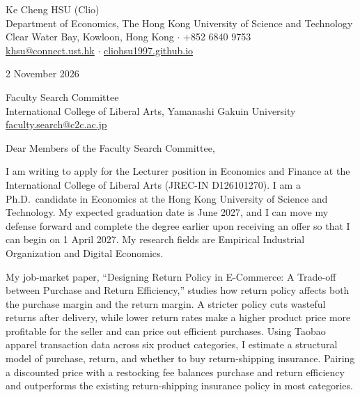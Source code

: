 \documentclass[11pt]{article}
\begin{document}
\begin{flushleft}
Ke Cheng HSU (Clio)\\
Department of Economics, The Hong Kong University of Science and Technology\\
Clear Water Bay, Kowloon, Hong Kong $\cdot$ +852 6840 9753\\
\href{mailto:khsu@connect.ust.hk}{khsu@connect.ust.hk} $\cdot$ \href{https://cliohsu1997.github.io}{cliohsu1997.github.io}
\end{flushleft}

2 November 2026

\vspace{0.2em}
Faculty Search Committee\\
International College of Liberal Arts, Yamanashi Gakuin University\\
\href{mailto:faculty.search@c2c.ac.jp}{faculty.search@c2c.ac.jp}

\vspace{0.2em}
Dear Members of the Faculty Search Committee,

I am writing to apply for the Lecturer position in Economics and Finance at the International College of Liberal Arts (JREC-IN D126101270). I am a Ph.D.\ candidate in Economics at the Hong Kong University of Science and Technology. My expected graduation date is June 2027, and I can move my defense forward and complete the degree earlier upon receiving an offer so that I can begin on 1 April 2027. My research fields are Empirical Industrial Organization and Digital Economics.

My job-market paper, ``Designing Return Policy in E-Commerce: A Trade-off between Purchase and Return Efficiency,'' studies how return policy affects both the purchase margin and the return margin. A stricter policy cuts wasteful returns after delivery, while lower return rates make a higher product price more profitable for the seller and can price out efficient purchases. Using Taobao apparel transaction data across six product categories, I estimate a structural model of purchase, return, and whether to buy return-shipping insurance. Pairing a discounted price with a restocking fee balances purchase and return efficiency and outperforms the existing return-shipping insurance policy in most categories.
\end{document}
